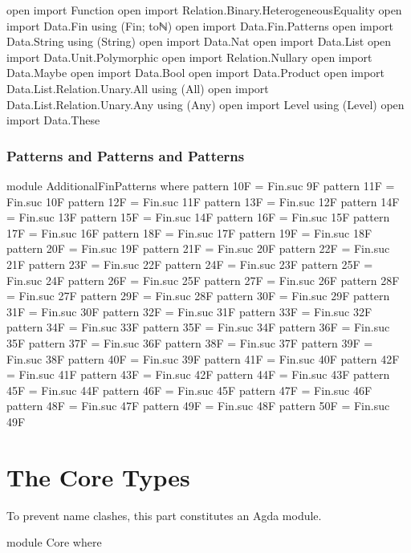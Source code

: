 \documentclass{report}
\begin{document}
\begin{code}
open import Function
open import Relation.Binary.HeterogeneousEquality
open import Data.Fin using (Fin; toℕ)
open import Data.Fin.Patterns
open import Data.String using (String)
open import Data.Nat
open import Data.List
open import Data.Unit.Polymorphic
open import Relation.Nullary
open import Data.Maybe
open import Data.Bool
open import Data.Product
open import Data.List.Relation.Unary.All using (All)
open import Data.List.Relation.Unary.Any using (Any)
open import Level using (Level)
open import Data.These
\end{code}

\section{Patterns and Patterns and Patterns}

\begin{code}
module AdditionalFinPatterns where
  pattern 10F = Fin.suc 9F
  pattern 11F = Fin.suc 10F
  pattern 12F = Fin.suc 11F
  pattern 13F = Fin.suc 12F
  pattern 14F = Fin.suc 13F
  pattern 15F = Fin.suc 14F
  pattern 16F = Fin.suc 15F
  pattern 17F = Fin.suc 16F
  pattern 18F = Fin.suc 17F
  pattern 19F = Fin.suc 18F
  pattern 20F = Fin.suc 19F
  pattern 21F = Fin.suc 20F
  pattern 22F = Fin.suc 21F
  pattern 23F = Fin.suc 22F
  pattern 24F = Fin.suc 23F
  pattern 25F = Fin.suc 24F
  pattern 26F = Fin.suc 25F
  pattern 27F = Fin.suc 26F
  pattern 28F = Fin.suc 27F
  pattern 29F = Fin.suc 28F
  pattern 30F = Fin.suc 29F
  pattern 31F = Fin.suc 30F
  pattern 32F = Fin.suc 31F
  pattern 33F = Fin.suc 32F
  pattern 34F = Fin.suc 33F
  pattern 35F = Fin.suc 34F
  pattern 36F = Fin.suc 35F
  pattern 37F = Fin.suc 36F
  pattern 38F = Fin.suc 37F
  pattern 39F = Fin.suc 38F
  pattern 40F = Fin.suc 39F
  pattern 41F = Fin.suc 40F
  pattern 42F = Fin.suc 41F
  pattern 43F = Fin.suc 42F
  pattern 44F = Fin.suc 43F
  pattern 45F = Fin.suc 44F
  pattern 46F = Fin.suc 45F
  pattern 47F = Fin.suc 46F
  pattern 48F = Fin.suc 47F
  pattern 49F = Fin.suc 48F
  pattern 50F = Fin.suc 49F
\end{code}

\part{The Core Types}
To prevent name clashes, this part constitutes an Agda module.

\begin{code}
module Core where
\end{code}
\end{document}

